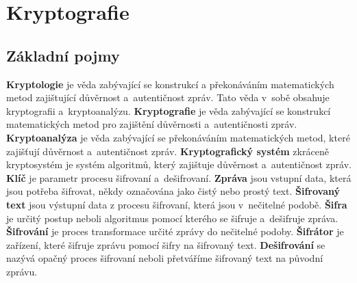 \chapter{Kryptografie}
\section{Základní pojmy}
\textbf{Kryptologie} je věda zabývající se konstrukcí a překonáváním matematických metod zajištující důvěrnost a~autentičnost zpráv. Tato věda v~sobě obsahuje kryptografii a~kryptoanalýzu.\newline
\textbf{Kryptografie} je věda zabývající se konstrukcí matematických metod pro zajištění důvěrnosti a~autentičnosti zpráv.\newline %
\textbf{Kryptoanalýza} je věda zabývající se překonáváním matematických metod, které zajišťují důvěrnost a~autentičnost zpráv.\newline %
\textbf{Kryptografický systém} zkráceně kryptosystém je systém algoritmů, který zajištuje důvěrnost a~autentičnost zpráv.\cite{Burda9788021446120ISBN}\newline 
\textbf{Klíč} je parametr procesu šifrovaní a~dešifrovaní.\cite{Burda9788072049257ISBN}\newline %
\textbf{Zpráva} jsou vstupní data, která jsou potřeba šifrovat, někdy označována jako čistý nebo prostý text.\cite{Mao0130669431ISBN}\newline %
\textbf{Šifrovaný text} jsou výstupní data z procesu šifrovaní, která jsou v~nečitelné podobě.\newline %
\textbf{Šifra} je určitý postup neboli algoritmus pomocí kterého se šifruje a~dešifruje zpráva.\cite{Burda9788072049257ISBN}\newline
\textbf{Šifrování} je proces transformace určité zprávy do nečitelné podoby.\cite{Mao0130669431ISBN}\newline %
\textbf{Šifrátor} je zařízení, které šifruje zprávu pomocí šifry na šifrovaný text.\newline
\textbf{Dešifrování} se nazývá opačný proces šifrovaní neboli přetváříme šifrovaný text na původní zprávu.\cite{Mao0130669431ISBN} %
